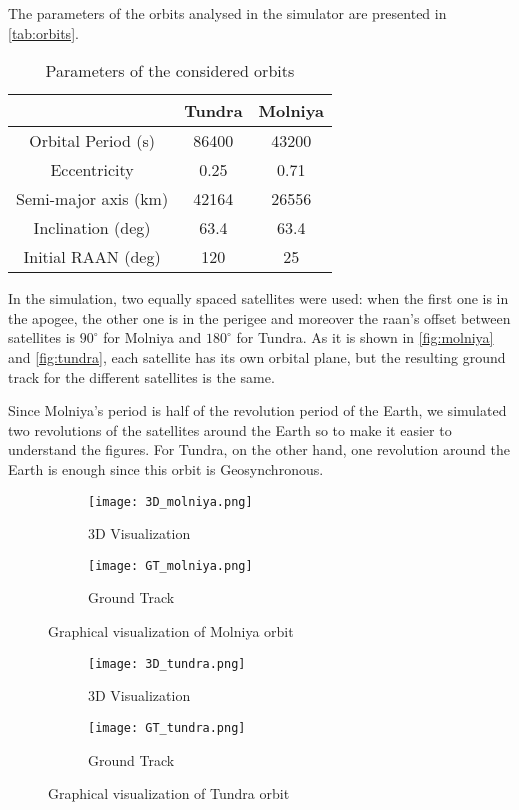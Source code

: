 The parameters of the orbits analysed in the simulator are presented in \autoref{tab:orbits}.

\begin{table}[ht]
	\centering
	\begin{tabular}{ccc}
	\toprule
	& Tundra & Molniya\\
	\midrule
	Orbital Period (s)     & 86400   & 43200\\
	Eccentricity        & 0.25   & 0.71\\
	Semi-major axis (km) & 42164 & 26556\\
	Inclination (deg)      & 63.4 & 63.4\\
	Initial RAAN (deg)	& 120	& 25\\
	\bottomrule
	\end{tabular}
	\caption{Parameters of the considered orbits}
	\label{tab:orbits}
\end{table}

In the simulation, two equally spaced satellites were used: when the first one is in the apogee, the other one is in the perigee and moreover the \gls{raan}'s offset between satellites is $90^\circ$ for Molniya and $180^\circ$ for Tundra.
As it is shown in \autoref{fig:molniya} and \autoref{fig:tundra}, each satellite has its own orbital plane, but the resulting ground track for the different satellites is the same.

Since Molniya's period is half of the revolution period of the Earth, we simulated two revolutions of the satellites around the Earth so to make it easier to understand the figures.
For Tundra, on the other hand, one revolution around the Earth is enough since this orbit is Geosynchronous.

\begin{figure}[!htbp]
	\begin{subfigure}{.5\textwidth}
	\centering
	\texttt{[image: 3D\_molniya.png]}
	\caption{3D Visualization}
	\label{fig:3D_molniya}
	\end{subfigure}
	\begin{subfigure}{.5\textwidth}
	\centering
	\texttt{[image: GT\_molniya.png]}
	\caption{Ground Track}
	\label{fig:GT_molniya}
	\end{subfigure}
	\caption{Graphical visualization of Molniya orbit}
	\label{fig:molniya}
\end{figure}

\begin{figure}[!htbp]
	\begin{subfigure}{.5\textwidth}
	\centering
	\texttt{[image: 3D\_tundra.png]}
	\caption{3D Visualization}
	\label{fig:3D_tundra}
	\end{subfigure}
	\begin{subfigure}{.5\textwidth}
	\centering
	\texttt{[image: GT\_tundra.png]}
	\caption{Ground Track}
	\label{fig:GT_tundra}
	\end{subfigure}
	\caption{Graphical visualization of Tundra orbit}
	\label{fig:tundra}
\end{figure}

